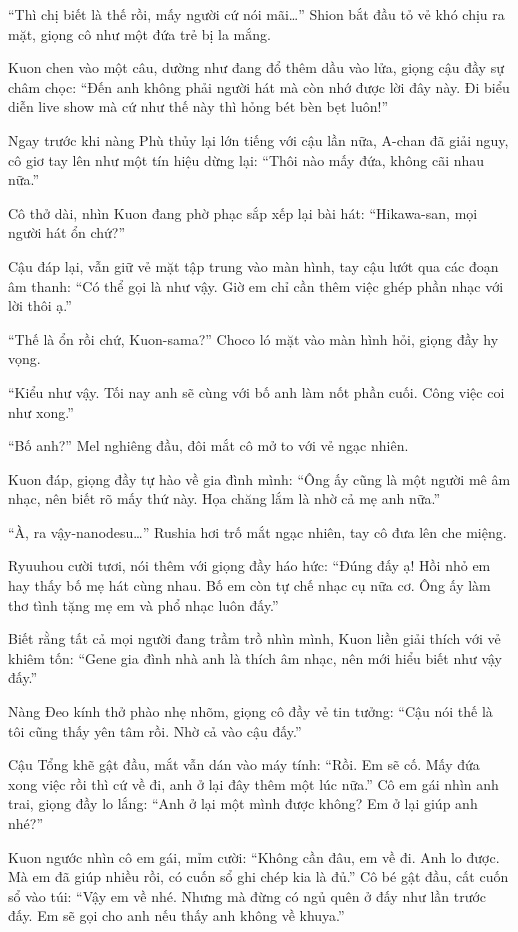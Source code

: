 \documentclass[../main.tex]{subfiles}
\begin{document}
``Thì chị biết là thế rồi, mấy người cứ nói mãi\dots'' Shion bắt đầu tỏ vẻ khó chịu ra mặt, giọng cô như một đứa trẻ bị la mắng.

Kuon chen vào một câu, dường như đang đổ thêm dầu vào lửa, giọng cậu đầy sự châm chọc: ``Đến anh không phải người hát mà còn nhớ được lời đây này. Đi biểu diễn live show mà cứ như thế này thì hỏng bét bèn bẹt luôn!''

Ngay trước khi nàng Phù thủy lại lớn tiếng với cậu lần nữa, A-chan đã giải nguy, cô giơ tay lên như một tín hiệu dừng lại: ``Thôi nào mấy đứa, không cãi nhau nữa.''

Cô thở dài, nhìn Kuon đang phờ phạc sắp xếp lại bài hát: ``Hikawa-san, mọi người hát ổn chứ?''

Cậu đáp lại, vẫn giữ vẻ mặt tập trung vào màn hình, tay cậu lướt qua các đoạn âm thanh: ``Có thể gọi là như vậy. Giờ em chỉ cần thêm việc ghép phần nhạc với lời thôi ạ.''

``Thế là ổn rồi chứ, Kuon-sama?'' Choco ló mặt vào màn hình hỏi, giọng đầy hy vọng.

``Kiểu như vậy. Tối nay anh sẽ cùng với bố anh làm nốt phần cuối. Công việc coi như xong.''

``Bố anh?'' Mel nghiêng đầu, đôi mắt cô mở to với vẻ ngạc nhiên.

Kuon đáp, giọng đầy tự hào về gia đình mình: ``Ông ấy cũng là một người mê âm nhạc, nên biết rõ mấy thứ này. Họa chăng lắm là nhờ cả mẹ anh nữa.''

``À, ra vậy-nanodesu\dots''  Rushia hơi trố mắt ngạc nhiên, tay cô đưa lên che miệng.

Ryuuhou cười tươi, nói thêm với giọng đầy háo hức: ``Đúng đấy ạ! Hồi nhỏ em hay thấy bố mẹ hát cùng nhau. Bố em còn tự chế nhạc cụ nữa cơ. Ông ấy làm thơ tình tặng mẹ em và phổ nhạc luôn đấy.''

Biết rằng tất cả mọi người đang trầm trồ nhìn mình, Kuon liền giải thích với vẻ khiêm tốn: ``Gene gia đình nhà anh là thích âm nhạc, nên mới hiểu biết như vậy đấy.''

Nàng Đeo kính thở phào nhẹ nhõm, giọng cô đầy vẻ tin tưởng: ``Cậu nói thế là tôi cũng thấy yên tâm rồi. Nhờ cả vào cậu đấy.''

Cậu Tổng khẽ gật đầu, mắt vẫn dán vào máy tính: ``Rồi. Em sẽ cố. Mấy đứa xong việc rồi thì cứ về đi, anh ở lại đây thêm một lúc nữa.'' Cô em gái nhìn anh trai, giọng đầy lo lắng: ``Anh ở lại một mình được không? Em ở lại giúp anh nhé?''

Kuon ngước nhìn cô em gái, mỉm cười: ``Không cần đâu, em về đi. Anh lo được. Mà em đã giúp nhiều rồi, có cuốn sổ ghi chép kia là đủ.'' Cô bé gật đầu, cất cuốn sổ vào túi: ``Vậy em về nhé. Nhưng mà đừng có ngủ quên ở đấy như lần trước đấy. Em sẽ gọi cho anh nếu thấy anh không về khuya.''
\end{document}
